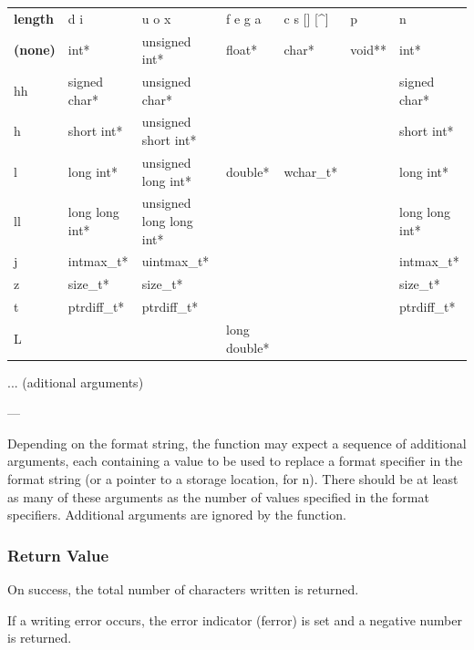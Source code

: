 \documentclass[10pt]{article}
\begin{document}
\begin{center}
    \begin{tabularx}{\linewidth}{|l|*{6}{>{\RaggedRight\arraybackslash}X|}}
        \hline
        & \multicolumn{6}{c|}{\textbf{Specifiers}} \\
        \hline
        \textbf{length} & d i & u o x & f e g a & c s [] [\^{}] & p & n \\
        \hline
        \textbf{(none)} & int* & unsigned int* & float* & char* & void** & int* \\
        \hline
        hh & signed char* & unsigned char* & & & & signed char* \\
        \hline
        h & short int* & unsigned short int* & & & & short int* \\
        \hline
        l & long int* & unsigned long int* & double* & wchar\_t* & & long int* \\
        \hline
        ll & long long int* & unsigned long long int* & & & & long long int* \\
        \hline
        j & intmax\_t* & uintmax\_t* & & & & intmax\_t* \\
        \hline
        z & size\_t* & size\_t* & & & & size\_t* \\
        \hline
        t & ptrdiff\_t* & ptrdiff\_t* & & & & ptrdiff\_t* \\
        \hline
        L & & & long double* & & & \\
        \hline
    \end{tabularx}
\end{center}

... (aditional arguments)

---

Depending on the format string, the function may expect a sequence of additional
arguments, each containing a value to be used to replace a format specifier in
the format string (or a pointer to a storage location, for n). There should be
at least as many of these arguments as the number of values specified in the
format specifiers. Additional arguments are ignored by the function.

\subsubsection{Return Value}

On success, the total number of characters written is returned.

If a writing error occurs, the error indicator (ferror) is set and a negative
number is returned.
\end{document}
